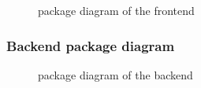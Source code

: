 \begin{figure}[!ht]
    \centering
    
    \caption{package diagram of the frontend}
    \label{fig:package_diagram_front_end}
\end{figure}
\newpage
\subsubsection*{Backend package diagram}
\begin{figure}[!ht]
    \centering
    
    \caption{package diagram of the backend}
    \label{fig:package_diagram_back_end}
\end{figure}

\newpage
